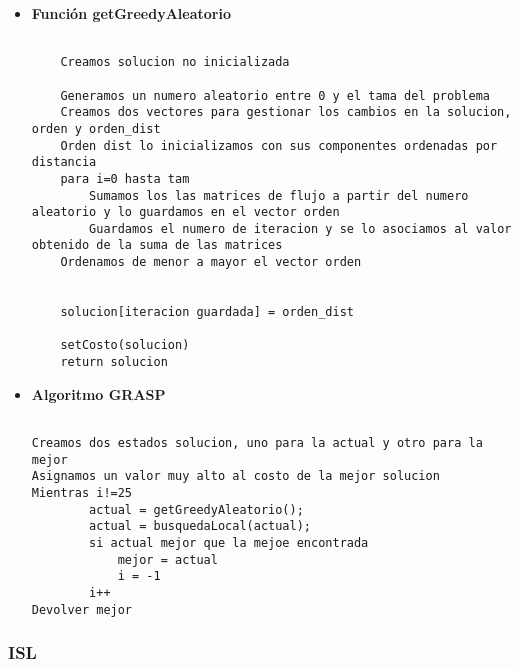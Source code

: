 		\begin{itemize}
		
			\item \textbf{Función getGreedyAleatorio}
		
			\begin{lstlisting}[language=SH]
					
	Creamos solucion no inicializada
	
	Generamos un numero aleatorio entre 0 y el tama del problema
	Creamos dos vectores para gestionar los cambios en la solucion, orden y orden_dist
	Orden dist lo inicializamos con sus componentes ordenadas por distancia
	para i=0 hasta tam
		Sumamos los las matrices de flujo a partir del numero aleatorio y lo guardamos en el vector orden
		Guardamos el numero de iteracion y se lo asociamos al valor obtenido de la suma de las matrices
	Ordenamos de menor a mayor el vector orden
	
	
	solucion[iteracion guardada] = orden_dist
	
	setCosto(solucion)
	return solucion

	\end{lstlisting}
		
			\item \textbf{Algoritmo GRASP}
		
			\begin{lstlisting}[language=SH]
					
Creamos dos estados solucion, uno para la actual y otro para la mejor
Asignamos un valor muy alto al costo de la mejor solucion
Mientras i!=25
		actual = getGreedyAleatorio();
		actual = busquedaLocal(actual);
		si actual mejor que la mejoe encontrada
			mejor = actual
			i = -1
		i++
Devolver mejor

	\end{lstlisting}
		
		\end{itemize}
		
			\newpage	
		\subsubsection{ISL}
		
